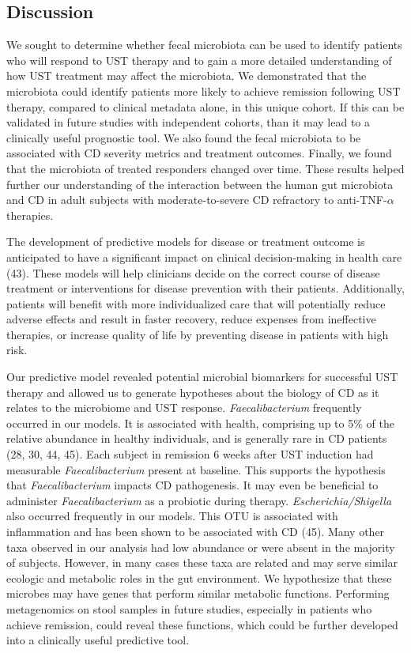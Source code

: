 \documentclass[12pt,]{article}
\begin{document}
\subsection{Discussion}\label{discussion}

We sought to determine whether fecal microbiota can be used to identify
patients who will respond to UST therapy and to gain a more detailed
understanding of how UST treatment may affect the microbiota. We
demonstrated that the microbiota could identify patients more likely to
achieve remission following UST therapy, compared to clinical metadata
alone, in this unique cohort. If this can be validated in future studies
with independent cohorts, than it may lead to a clinically useful
prognostic tool. We also found the fecal microbiota to be associated
with CD severity metrics and treatment outcomes. Finally, we found that
the microbiota of treated responders changed over time. These results
helped further our understanding of the interaction between the human
gut microbiota and CD in adult subjects with moderate-to-severe CD
refractory to anti-TNF-\({\alpha}\) therapies.

The development of predictive models for disease or treatment outcome is
anticipated to have a significant impact on clinical decision-making in
health care (43). These models will help clinicians decide on the
correct course of disease treatment or interventions for disease
prevention with their patients. Additionally, patients will benefit with
more individualized care that will potentially reduce adverse effects
and result in faster recovery, reduce expenses from ineffective
therapies, or increase quality of life by preventing disease in patients
with high risk.

Our predictive model revealed potential microbial biomarkers for
successful UST therapy and allowed us to generate hypotheses about the
biology of CD as it relates to the microbiome and UST response.
\emph{Faecalibacterium} frequently occurred in our models. It is
associated with health, comprising up to 5\% of the relative abundance
in healthy individuals, and is generally rare in CD patients (28, 30,
44, 45). Each subject in remission 6 weeks after UST induction had
measurable \emph{Faecalibacterium} present at baseline. This supports
the hypothesis that \emph{Faecalibacterium} impacts CD pathogenesis. It
may even be beneficial to administer \emph{Faecalibacterium} as a
probiotic during therapy. \emph{Escherichia/Shigella} also occurred
frequently in our models. This OTU is associated with inflammation and
has been shown to be associated with CD (45). Many other taxa observed
in our analysis had low abundance or were absent in the majority of
subjects. However, in many cases these taxa are related and may serve
similar ecologic and metabolic roles in the gut environment. We
hypothesize that these microbes may have genes that perform similar
metabolic functions. Performing metagenomics on stool samples in future
studies, especially in patients who achieve remission, could reveal
these functions, which could be further developed into a clinically
useful predictive tool.
\end{document}

